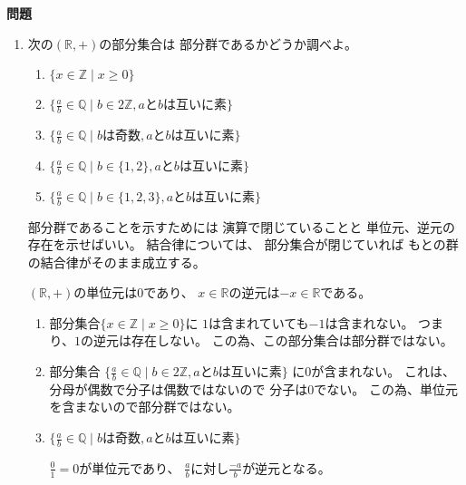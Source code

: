 \documentclass[12pt,b5paper]{ltjsarticle}
\begin{document}
\hrulefill
\textbf{問題}
\hrulefill

\begin{enumerate}
 \item
      次の$(\mathbb{R},+)$の部分集合は
      部分群であるかどうか調べよ。
      \begin{enumerate}
       \item
            $\{ x \in \mathbb{Z} \mid x \geq 0\}$

       \item
            $\{ \frac{a}{b} \in \mathbb{Q} \mid b\in 2\mathbb{Z}, aとbは互いに素\}$

       \item
            $\{ \frac{a}{b} \in \mathbb{Q} \mid bは奇数, aとbは互いに素\}$

       \item
            $\{ \frac{a}{b} \in \mathbb{Q} \mid b\in\{1,2\}, aとbは互いに素\}$

       \item
            $\{ \frac{a}{b} \in \mathbb{Q} \mid b\in\{1,2,3\}, aとbは互いに素\}$
      \end{enumerate}


\dotfill

      部分群であることを示すためには
      演算で閉じていることと
      単位元、逆元の存在を示せばいい。
      結合律については、
      部分集合が閉じていれば
      もとの群の結合律がそのまま成立する。

      $(\mathbb{R},+)$の単位元は$0$であり、
      $x\in \mathbb{R}$の逆元は$-x\in\mathbb{R}$である。

      \begin{enumerate}
       \item
            部分集合$\{ x \in \mathbb{Z} \mid x \geq 0 \}$に
            $1$は含まれていても$-1$は含まれない。
            つまり、$1$の逆元は存在しない。
            この為、この部分集合は部分群ではない。

       \item
            部分集合
            $\{ \frac{a}{b} \in \mathbb{Q} \mid b\in 2\mathbb{Z}, aとbは互いに素\}$
            に$0$が含まれない。
            これは、分母が偶数で分子は偶数ではないので
            分子は$0$でない。
            この為、単位元を含まないので部分群ではない。

       \item
            $\{ \frac{a}{b} \in \mathbb{Q} \mid bは奇数, aとbは互いに素\}$

            $\frac{0}{1}=0$が単位元であり、
            $\frac{a}{b}$に対し$\frac{-a}{b}$が逆元となる。


\end{enumerate}
\end{enumerate}
\end{document}
